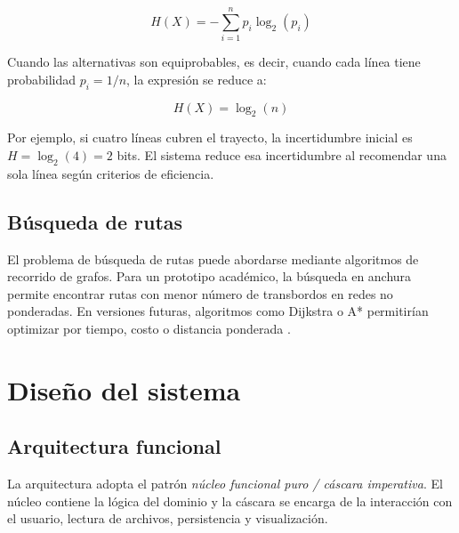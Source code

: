 \documentclass[stu,12pt,floatsintext]{apa7}
\begin{document}
\begin{equation}
H(X) = - \sum_{i=1}^{n} p_i \log_2(p_i)
\label{eq:entropia}
\end{equation}

Cuando las alternativas son equiprobables, es decir, cuando cada línea tiene probabilidad $p_i = 1/n$, la expresión se reduce a:

\begin{equation}
H(X) = \log_2(n)
\label{eq:entropia-equiprobable}
\end{equation}

Por ejemplo, si cuatro líneas cubren el trayecto, la incertidumbre inicial es $H = \log_2(4) = 2$ bits. El sistema reduce esa incertidumbre al recomendar una sola línea según criterios de eficiencia.

\subsection{Búsqueda de rutas}
El problema de búsqueda de rutas puede abordarse mediante algoritmos de recorrido de grafos. Para un prototipo académico, la búsqueda en anchura permite encontrar rutas con menor número de transbordos en redes no ponderadas. En versiones futuras, algoritmos como Dijkstra o A* permitirían optimizar por tiempo, costo o distancia ponderada \parencite{cormen2009,dijkstra1959}.

\section{Diseño del sistema}
\subsection{Arquitectura funcional}
La arquitectura adopta el patrón \textit{núcleo funcional puro / cáscara imperativa}. El núcleo contiene la lógica del dominio y la cáscara se encarga de la interacción con el usuario, lectura de archivos, persistencia y visualización.
\end{document}

